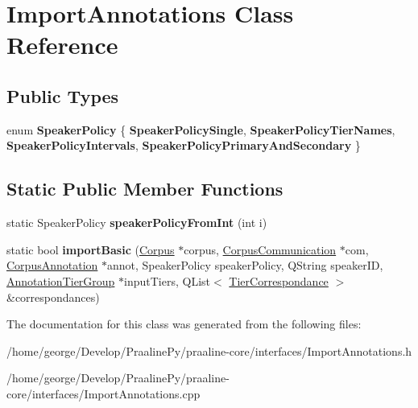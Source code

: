 \hypertarget{class_import_annotations}{}\section{Import\+Annotations Class Reference}
\label{class_import_annotations}
\subsection*{Public Types}
\begin{DoxyCompactItemize}
\item 
\mbox{\label{class_import_annotations_a676fb9042a842ff80397fd65a81163f3}} 
enum {\bfseries Speaker\+Policy} \{ {\bfseries Speaker\+Policy\+Single}, 
{\bfseries Speaker\+Policy\+Tier\+Names}, 
{\bfseries Speaker\+Policy\+Intervals}, 
{\bfseries Speaker\+Policy\+Primary\+And\+Secondary}
 \}
\end{DoxyCompactItemize}
\subsection*{Static Public Member Functions}
\begin{DoxyCompactItemize}
\item 
\mbox{\label{class_import_annotations_af68d1f0f77fbef9061e735bd29038e77}} 
static Speaker\+Policy {\bfseries speaker\+Policy\+From\+Int} (int i)
\item 
\mbox{\label{class_import_annotations_aacdd4663e821715f82a730eaaccbe8b9}} 
static bool {\bfseries import\+Basic} (\hyperlink{class_corpus}{Corpus} $\ast$corpus, \hyperlink{class_corpus_communication}{Corpus\+Communication} $\ast$com, \hyperlink{class_corpus_annotation}{Corpus\+Annotation} $\ast$annot, Speaker\+Policy speaker\+Policy, Q\+String speaker\+ID, \hyperlink{class_annotation_tier_group}{Annotation\+Tier\+Group} $\ast$input\+Tiers, Q\+List$<$ \hyperlink{class_tier_correspondance}{Tier\+Correspondance} $>$ \&correspondances)
\end{DoxyCompactItemize}


The documentation for this class was generated from the following files\+:\begin{DoxyCompactItemize}
\item 
/home/george/\+Develop/\+Praaline\+Py/praaline-\/core/interfaces/Import\+Annotations.\+h\item 
/home/george/\+Develop/\+Praaline\+Py/praaline-\/core/interfaces/Import\+Annotations.\+cpp\end{DoxyCompactItemize}
